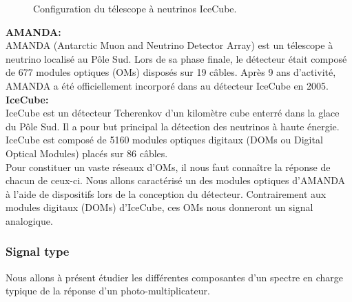 \begin{figure}[h!]
    \caption{\label{fig:IceCube} Configuration du télescope à neutrinos IceCube.}
\end{figure}

\textbf{AMANDA:}\\
AMANDA (Antarctic Muon and Neutrino Detector Array) est un télescope à neutrino localisé au Pôle Sud. Lors de sa phase finale, le détecteur était composé de 677 modules optiques (OMs) disposés sur 19 câbles. Après 9 ans d'activité, AMANDA a été officiellement incorporé dans au détecteur IceCube en 2005.\\

\textbf{IceCube:}\\
IceCube est un détecteur Tcherenkov d'un kilomètre cube enterré dans la glace du Pôle Sud. Il a pour but principal la détection des neutrinos à haute énergie. IceCube est composé de 5160 modules optiques digitaux (DOMs ou Digital Optical Modules) placés sur 86 câbles.\\

Pour constituer un vaste réseaux d'OMs, il nous faut connaître la réponse de chacun de ceux-ci. Nous allons caractérisé un des modules optiques d'AMANDA à l'aide de dispositifs lors de la conception du détecteur. Contrairement aux modules digitaux (DOMs) d'IceCube, ces OMs nous donneront un signal analogique. 


\subsubsection{Signal type}

Nous allons à présent étudier les différentes composantes d'un spectre en charge typique de la réponse d'un photo-multiplicateur.\\

